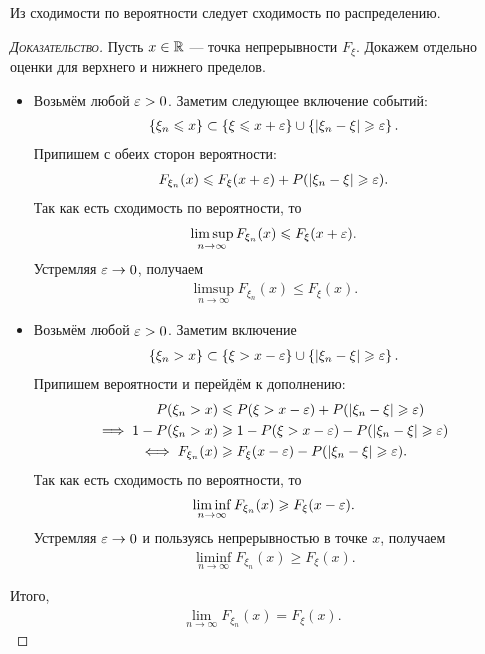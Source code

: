 \documentclass[../main.tex]{subfiles}
\begin{document}
\begin{prop}
 Из сходимости по вероятности следует сходимость по распределению.
\end{prop}
\begin{proof}[\normalfont\textsc{Доказательство}]
 Пусть $ x \in \mathbb{R} $ --- точка непрерывности $ F_\xi $. Докажем отдельно оценки для верхнего и нижнего пределов.
 \begin{itemize}
  \item Возьмём любой $ \varepsilon > 0 $. Заметим следующее включение событий:
   \begin{align*}
    \left\{ \xi_n \leqslant x \right\} \subset \left\{ \xi \leqslant x + \varepsilon \right\} \cup \left\{ \left| \xi_n-\xi \right| \geqslant \varepsilon \right\}.
   \end{align*} Припишем с обеих сторон вероятности:
   \begin{align*}
    F_{\xi_n}(x) \leqslant F_{\xi}(x + \varepsilon) + P(\left| \xi_n-\xi \right| \geqslant \varepsilon).
   \end{align*} Так как есть сходимость по вероятности, то
   \begin{align*}
    \limsup_{n \to \infty} F_{\xi_n}(x) \leqslant F_\xi(x + \varepsilon).
   \end{align*} Устремляя $ \varepsilon \to 0 $, получаем
   \begin{align*}
    \limsup_{n \to \infty} F_{\xi_n}(x) \leqslant F_\xi(x).
   \end{align*}
  \item Возьмём любой $ \varepsilon > 0 $. Заметим включение
   \begin{align*}
    \left\{ \xi_n > x \right\} \subset \left\{ \xi > x - \varepsilon \right\} \cup \left\{ \left| \xi_n-\xi \right| \geqslant \varepsilon \right\}.
   \end{align*} Припишем вероятности и перейдём к дополнению:
   \begin{align*}
    P(\xi_n > x) &\leqslant P(\xi > x - \varepsilon) + P(\left| \xi_n-\xi \right| \geqslant \varepsilon) \\
    \implies 1 - P(\xi_n > x) &\geqslant 1 - P(\xi > x - \varepsilon) - P(\left| \xi_n-\xi \right| \geqslant \varepsilon) \\
    \iff F_{\xi_n}(x) &\geqslant F_\xi(x - \varepsilon) - P(\left| \xi_n-\xi \right| \geqslant \varepsilon).
   \end{align*} Так как есть сходимость по вероятности, то
   \begin{align*}
    \liminf_{n \to \infty} F_{\xi_n}(x) \geqslant F_\xi(x - \varepsilon).
   \end{align*} Устремляя $ \varepsilon \to 0 $ и пользуясь непрерывностью в точке $ x $, получаем
   \begin{align*}
    \liminf_{n \to \infty} F_{\xi_n}(x) \geqslant F_\xi(x).
   \end{align*}
 \end{itemize} Итого,
 \begin{align*}
  \lim_{n \to \infty} F_{\xi_n}(x) = F_\xi(x).
 \end{align*}
\end{proof}
\end{document}
